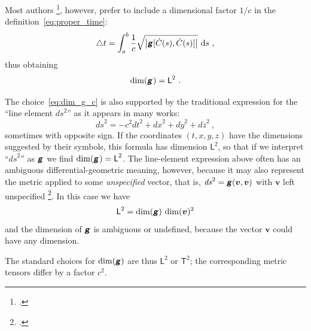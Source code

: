 \documentclass[\ifafour a4paper,12pt,\else a5paper,10pt,\fi%
onecolumn,oneside,article,%
british%
]{memoir}
\makeatletter
\theoremstyle{remark}
\theoremstyle{innote}
\newcommand*{\mathte}[1]{\textbf{\textit{\textsf{#1}}}}
\newcommand*{\citep}{\footcites}
\newcommand*{\di}{\mathrm{d}}%
\newcommand*{\incr}{\triangle}%
\DeclarePairedDelimiter\abs{\lvert}{\rvert}
\renewcommand*{\|}[1][]{\nonscript\,#1\vert\nonscript\;\mathopen{}}
\newcommand*{\sect}{\S}%
\newcommand*{\chap}{ch.}%
\newcommand*{\eqn}{eq.}%
\newcommand*{\eg}{{e.g.}}
\newcommand*{\cf}{{cf.}}
\newcommand*{\q}{}%
\DeclareRobustCommand*{\q}{%
  \mathord{\mathpalette\bigcdot@{}}%
}
\newcommand*{\bigcdot@scalefactor}{0.7}
\newcommand*{\bigcdot@widthfactor}{1.5}
\newcommand*{\bigcdot@}[2]{%
  \sbox0{$#1\vcenter{}$}%
  \sbox2{$#1\cdot\m@th$}%
  \hbox to \bigcdot@widthfactor\wd2{%
    \hfil
    \raise\ht0\hbox{%
      \scalebox{\bigcdot@scalefactor}{%
        \lower\ht0\hbox{$#1\bullet\m@th$}%
      }%
    }%
    \hfil
  }%
}
\newcommand*{\Le}{\textsf{L}}
\newcommand*{\Ti}{\textsf{T}}
\newcommand*{\yg}{\mathte{g}}
\newcommand*{\ygc}{\mathte{g}}
\newcommand*{\yv}{\bm{v}}
\renewcommand*{\i}{\indices}
\newcommand*{\ds}{\mathit{ds}}
\newcommand*{\inct}{\incr t}
\newcommand*{\yC}{\dot{C}}
\makeatother
\begin{document}
Most authors \citep[\eg][\sect~V.62 \eqn~(62.02)]{fock1955_t1964}[\chap~11
\eqn~(11.21)]{curtisetal1985}[\sect~5.3
\eqn~(5.6)]{rindler1969_r1986}[\chap~6 \eqn~(6.24)]{hartle2003}, however,
prefer to include a dimensional factor $1/c$ in the
definition~\eqref{eq:proper_time}:
\begin{equation}%
  \label{eq:proper_time_c}
  \inct = \int_a^b
  \frac{1}{c} \sqrt{\abs*{\ygc[\yC(s),\yC(s)]}} \ \di s\ ,
\end{equation}
thus obtaining
\begin{equation}%
  \label{eq:dim_g_c}
  \dim(\ygc\i{_{\q\q}}) = \Le^{2}\ .
\end{equation}

The choice~\eqref{eq:dim_g_c} is also supported by the traditional
expression for the \enquote{line element $\ds^{2}$} as it appears in many
works:
\begin{equation}
  \label{eq:line_elem}
  \ds^{2} = -c^2\mathit{dt}^2 + \mathit{dx}^2 +\mathit{dy}^2 + \mathit{dz}^2
  \ ,
\end{equation}
sometimes with opposite sign. If the coordinates $(t,x,y,z)$ have the
dimensions suggested by their symbols, this formula has dimension
$\Le^{2}$, so that if we interpret \enquote{$\ds^{2}$} as $\ygc\i{_{\q\q}}$
we find $\dim(\ygc\i{_{\q\q}}) = \Le^{2}$. The line-element expression
above often has an ambiguous differential-geometric meaning, however,
because it may also represent the metric applied to some \emph{unspecified}
vector, that is, $\ds^{2} = \yg(\yv,\yv)$ with $\yv$ left unspecified
\citep[\cf][Box~3.2~D p.~77]{misneretal1970_r1973}. In this case we have
\begin{equation*}
  \label{eq:line_elem_dim_ambiguous}
  \Le^{2} = \dim(\yg)\,\dim(\yv)^{2}
\end{equation*}
and the dimension of $\yg$ is ambiguous or undefined, because the vector
$\yv$ could have any dimension.%

\medskip

The standard choices for $\dim(\yg)$ are thus $\Le^{2}$ or $\Ti^{2}$; the
corresponding metric tensors differ by a factor $c^{2}$.
\end{document}
